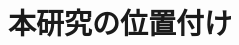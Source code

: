 \documentclass[../main]{subfiles}
\begin{document}
\section{本研究の位置付け}
\label{sec:intro_my_purpose}
\end{document}
